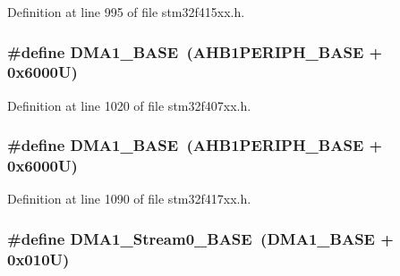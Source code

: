 Definition at line 995 of file stm32f415xx.\+h.

\subsubsection[{\texorpdfstring{D\+M\+A1\+\_\+\+B\+A\+SE}{DMA1_BASE}}]{\setlength{\rightskip}{0pt plus 5cm}\#define D\+M\+A1\+\_\+\+B\+A\+SE~({\bf A\+H\+B1\+P\+E\+R\+I\+P\+H\+\_\+\+B\+A\+SE} + 0x6000\+U)}\hypertarget{group___peripheral__registers__structures_gab2d8a917a0e4ea99a22ac6ebf279bc72}{}\label{group___peripheral__registers__structures_gab2d8a917a0e4ea99a22ac6ebf279bc72}


Definition at line 1020 of file stm32f407xx.\+h.

\subsubsection[{\texorpdfstring{D\+M\+A1\+\_\+\+B\+A\+SE}{DMA1_BASE}}]{\setlength{\rightskip}{0pt plus 5cm}\#define D\+M\+A1\+\_\+\+B\+A\+SE~({\bf A\+H\+B1\+P\+E\+R\+I\+P\+H\+\_\+\+B\+A\+SE} + 0x6000\+U)}\hypertarget{group___peripheral__registers__structures_gab2d8a917a0e4ea99a22ac6ebf279bc72}{}\label{group___peripheral__registers__structures_gab2d8a917a0e4ea99a22ac6ebf279bc72}


Definition at line 1090 of file stm32f417xx.\+h.

\subsubsection[{\texorpdfstring{D\+M\+A1\+\_\+\+Stream0\+\_\+\+B\+A\+SE}{DMA1_Stream0_BASE}}]{\setlength{\rightskip}{0pt plus 5cm}\#define D\+M\+A1\+\_\+\+Stream0\+\_\+\+B\+A\+SE~({\bf D\+M\+A1\+\_\+\+B\+A\+SE} + 0x010\+U)}\hypertarget{group___peripheral__registers__structures_ga0d3c52aa35dcc68f78b704dfde57ba95}{}\label{group___peripheral__registers__structures_ga0d3c52aa35dcc68f78b704dfde57ba95}


